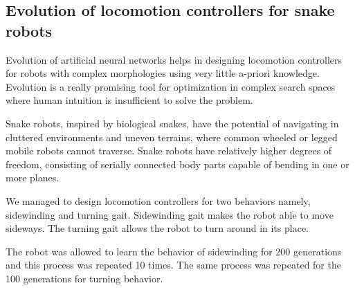 \documentclass{romjist}
\begin{document}
\subsection{Evolution of locomotion controllers for snake robots}
\cite{2}Evolution of artificial neural networks helps in designing locomotion controllers for robots with complex morphologies using very little a-priori knowledge. Evolution is a really promising tool for optimization in complex search spaces where human intuition is insufficient to solve the problem.\par
Snake robots, inspired by biological snakes, have the potential of navigating in cluttered environments and uneven terrains, where common wheeled or legged mobile robots cannot traverse. Snake robots have relatively higher degrees of freedom, consisting of serially connected body parts capable of bending in one or more planes.\par
We managed to design locomotion controllers for two behaviors namely, sidewinding and turning gait. Sidewinding gait makes the robot able to move sideways. The turning gait allows the robot to turn around in its place.\par
The robot was allowed to learn the behavior of sidewinding for 200 generations and this process was repeated 10 times. The same process was repeated for the 100 generations for turning behavior. 
\end{document}
